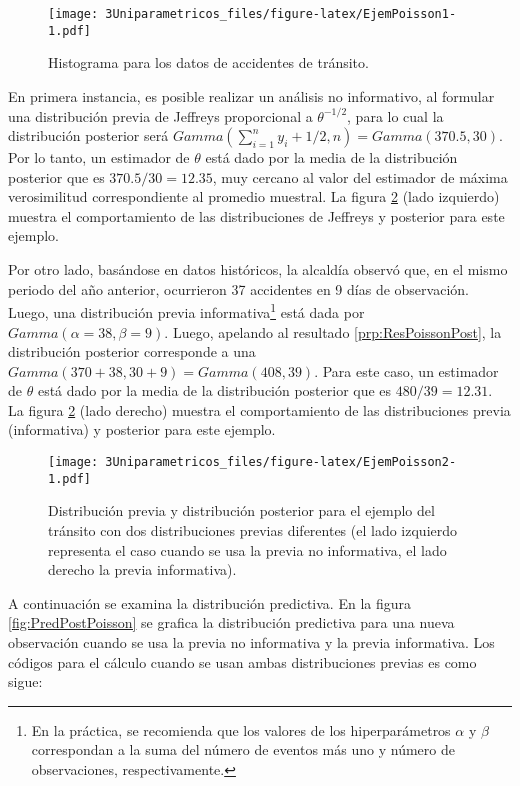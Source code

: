 \documentclass[
  12pt,
  spanish,
]{book}
\theoremstyle{definition}
\theoremstyle{definition}
\theoremstyle{definition}
\theoremstyle{definition}
\theoremstyle{remark}
\begin{document}
\begin{figure}
\centering
\texttt{[image: 3Uniparametricos\_files/figure-latex/EjemPoisson1-1.pdf]}
\caption{\label{fig:EjemPoisson1}Histograma para los datos de accidentes de tránsito.}
\end{figure}

En primera instancia, es posible realizar un análisis no informativo, al formular una distribución previa de Jeffreys proporcional a \(\theta^{-1/2}\), para lo cual la distribución posterior será \(Gamma(\sum_{i=1}^n y_i+1/2, n)=Gamma(370.5, 30)\). Por lo tanto, un estimador de \(\theta\) está dado por la media de la distribución posterior que es \(370.5/30=12.35\), muy cercano al valor del estimador de máxima verosimilitud correspondiente al promedio muestral. La figura \ref{fig:EjemPoisson2} (lado izquierdo) muestra el comportamiento de las distribuciones de Jeffreys y posterior para este ejemplo.

Por otro lado, basándose en datos históricos, la alcaldía observó que, en el mismo periodo del año anterior, ocurrieron 37 accidentes en 9 días de observación. Luego, una distribución previa informativa\footnote{En la práctica, se recomienda que los valores de los hiperparámetros \(\alpha\) y \(\beta\) correspondan a la suma del número de eventos más uno y número de observaciones, respectivamente.} está dada por \(Gamma(\alpha=38,\beta=9)\). Luego, apelando al resultado \ref{prp:ResPoissonPost}, la distribución posterior corresponde a una \(Gamma(370+38, 30+9)=Gamma(408, 39)\). Para este caso, un estimador de \(\theta\) está dado por la media de la distribución posterior que es \(480/39=12.31\). La figura \ref{fig:EjemPoisson2} (lado derecho) muestra el comportamiento de las distribuciones previa (informativa) y posterior para este ejemplo.

\begin{figure}
\centering
\texttt{[image: 3Uniparametricos\_files/figure-latex/EjemPoisson2-1.pdf]}
\caption{\label{fig:EjemPoisson2}Distribución previa y distribución posterior para el ejemplo del tránsito con dos distribuciones previas diferentes (el lado izquierdo representa el caso cuando se usa la previa no informativa, el lado derecho la previa informativa).}
\end{figure}

A continuación se examina la distribución predictiva. En la figura \ref{fig:PredPostPoisson} se grafica la distribución predictiva para una nueva observación cuando se usa la previa no informativa y la previa informativa. Los códigos para el cálculo cuando se usan ambas distribuciones previas es como sigue:
\end{document}
